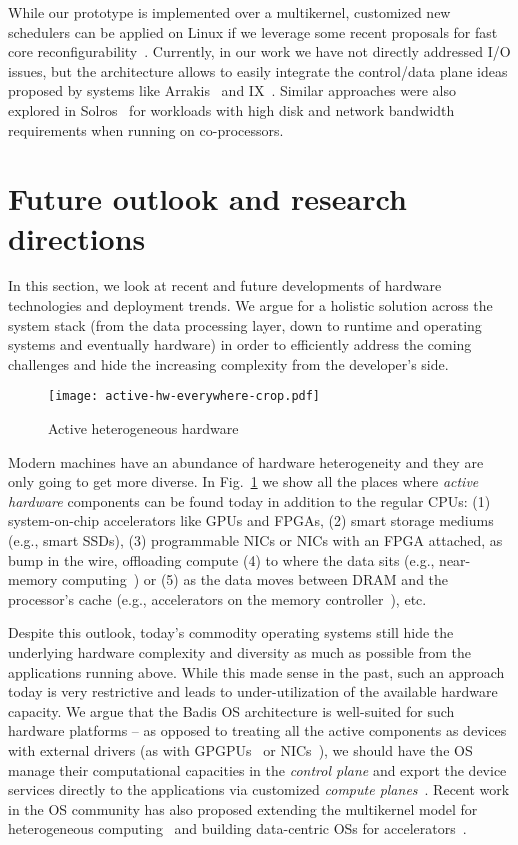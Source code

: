 \documentclass[11pt]{article}
\begin{document}
While our prototype is implemented over a multikernel, customized new schedulers can
be applied on Linux if we leverage some recent proposals for fast core 
reconfigurability~\cite{panneerselvam:atc15}. Currently, in our work we have not directly addressed I/O
issues, but the architecture allows to easily integrate the control/data plane 
ideas proposed by systems like Arrakis~\cite{Peter:osdi14} and IX~\cite{IX}. Similar 
approaches were also explored in Solros~\cite{solros} for workloads with high disk 
and network bandwidth requirements when running on co-processors.

% 

\section{Future outlook and research directions}

In this section, we look at recent and future developments of hardware technologies 
and deployment trends. We argue for a holistic solution across the system stack 
(from the data processing layer, down to runtime and operating systems and eventually 
hardware) in order to efficiently address the coming challenges and hide the 
increasing complexity from the developer's side.

\begin{figure}[t]
\centering
\texttt{[image: active-hw-everywhere-crop.pdf]}
\caption{Active heterogeneous hardware}
\label{fig:active_hw}
\end{figure}

Modern machines have an abundance of hardware heterogeneity and they are only going to get 
more diverse. In Fig.~\ref{fig:active_hw} we show all the places where {\it active hardware}
components can be found today in addition to the regular CPUs: (1) system-on-chip 
accelerators like GPUs and FPGAs, (2) smart storage mediums (e.g., smart SSDs), 
(3) programmable NICs or NICs with an FPGA attached, as bump in the wire, 
offloading compute (4) to where the data sits (e.g., near-memory 
computing~\cite{PIM}) or (5) as the data moves between DRAM and the 
processor's cache (e.g., accelerators on the memory controller~\cite{aingaran2015m7}), etc.

Despite this outlook, today's commodity operating systems still hide the underlying 
hardware complexity and diversity as much as possible from the applications running above. 
While this made sense in the past, such an approach today is very restrictive and leads
to under-utilization of the available hardware capacity. We argue that the Badis OS
architecture is well-suited for such hardware platforms -- as opposed to 
treating all the active components as devices with external drivers (as with 
GPGPUs~\cite{Rossbach:2011} or NICs~\cite{Peter:osdi14,IX}), we should have the
OS manage their computational capacities in the {\it control plane} and export the 
device services directly to the applications via customized {\it compute
planes}~\cite{daniel}. Recent work in the OS community has also proposed extending 
the multikernel model for heterogeneous computing~\cite{legoos} and building 
data-centric OSs for accelerators~\cite{solros}.
\end{document}
